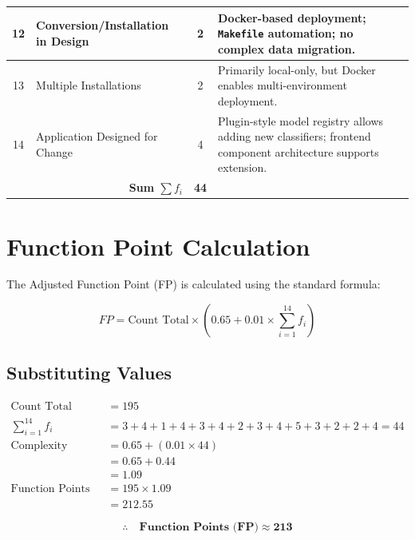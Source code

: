 \documentclass[11pt, a4paper]{article}
\begin{document}
\begin{center}
\begin{tabular}{|c|l|c|p{7.5cm}|}
12 & Conversion/Installation in Design     & 2 & Docker-based deployment; \texttt{Makefile} automation; no complex data migration. \\ \hline
13 & Multiple Installations                & 2 & Primarily local-only, but Docker enables multi-environment deployment. \\ \hline
14 & Application Designed for Change       & 4 & Plugin-style model registry allows adding new classifiers; frontend component architecture supports extension. \\ \hline
\multicolumn{2}{|r|}{\textbf{Sum $\sum f_i$}} & \textbf{44} & \\ \hline
\end{tabular}
\end{center}

\newpage
\section{Function Point Calculation}

The Adjusted Function Point (FP) is calculated using the standard formula:

$$\boxed{FP = \text{Count Total} \times \left(0.65 + 0.01 \times \sum_{i=1}^{14} f_i\right)}$$

\subsection{Substituting Values}

\begin{align}
\text{Count Total (CT)} &= 195 \\[6pt]
\sum_{i=1}^{14} f_i &= 3 + 4 + 1 + 4 + 3 + 4 + 2 + 3 + 4 + 5 + 3 + 2 + 2 + 4 = 44 \\[6pt]
\text{Complexity Adjustment Factor (CAF)} &= 0.65 + (0.01 \times 44) \\[4pt]
&= 0.65 + 0.44 \\[4pt]
&= 1.09 \\[8pt]
\text{Function Points (FP)} &= 195 \times 1.09 \\[4pt]
&= \boxed{212.55}
\end{align}

$$\therefore \quad \textbf{Function Points (FP)} \approx \textbf{213}$$

\newpage
\end{document}

